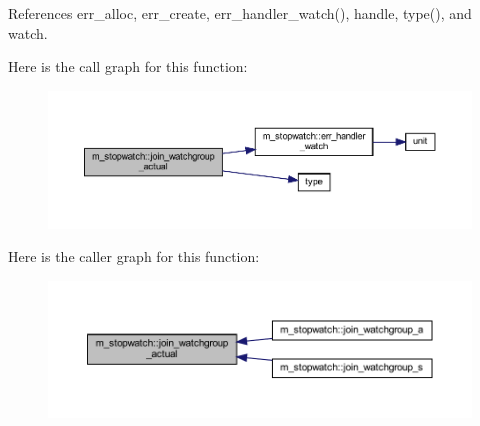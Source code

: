References err\+\_\+alloc, err\+\_\+create, err\+\_\+handler\+\_\+watch(), handle, type(), and watch.

Here is the call graph for this function\+:
\nopagebreak
\begin{figure}[H]
\begin{center}
\leavevmode
\includegraphics[width=350pt]{namespacem__stopwatch_ab39cca0de1fcfb5edb0991449b59a48b_cgraph}
\end{center}
\end{figure}
Here is the caller graph for this function\+:
\nopagebreak
\begin{figure}[H]
\begin{center}
\leavevmode
\includegraphics[width=350pt]{namespacem__stopwatch_ab39cca0de1fcfb5edb0991449b59a48b_icgraph}
\end{center}
\end{figure}
\mbox{\label{namespacem__stopwatch_ab3cc8ca14a1c99895e0dec06d0119cac}} 
